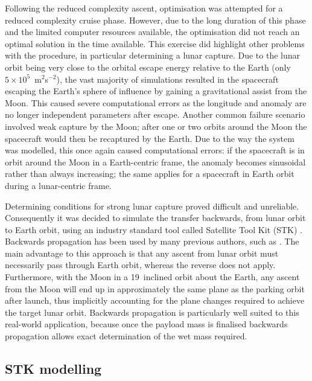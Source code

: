 Following the reduced complexity ascent, optimisation was attempted for a reduced complexity cruise phase. However, due to the long duration of this phase and the limited computer resources available, the optimisation did not reach an optimal solution in the time available. This exercise did highlight other problems with the procedure, in particular determining a lunar capture. Due to the lunar orbit being very close to the orbital escape energy relative to the Earth (only $5\times10^5$~m$^2$s$^{-2}$), the vast majority of simulations resulted in the spacecraft escaping the Earth's sphere of influence by gaining a gravitational assist from the Moon. This caused severe computational errors as the longitude and anomaly are no longer independent parameters after escape. Another common failure scenario involved weak capture by the Moon; after one or two orbits around the Moon the spacecraft would then be recaptured by the Earth. Due to the way the system was modelled, this once again caused computational errors: if the spacecraft is in orbit around the Moon in a Earth-centric frame, the anomaly becomes sinusoidal rather than always increasing; the same applies for a spacecraft in Earth orbit during a lunar-centric frame.

Determining conditions for strong lunar capture proved difficult and unreliable. Consequently it was decided to simulate the transfer backwards, from lunar orbit to Earth orbit, using an industry standard tool called Satellite Tool Kit (STK)%
. Backwards propagation has been used by many previous authors, such as \textcite{Kluever1995}. The main advantage to this approach is that any ascent from lunar orbit must necessarily pass through Earth orbit, whereas the reverse does not apply. Furthermore, with the Moon in a 19\degrees\ inclined orbit about the Earth, any ascent from the Moon will end up in approximately the same plane as the parking orbit after launch, thus implicitly accounting for the plane changes required to achieve the target lunar orbit. Backwards propagation is particularly well suited to this real-world application, because once the payload mass is finalised backwards propagation allows exact determination of the wet mass required.

\subsection{STK modelling} \label{sec:STK}


